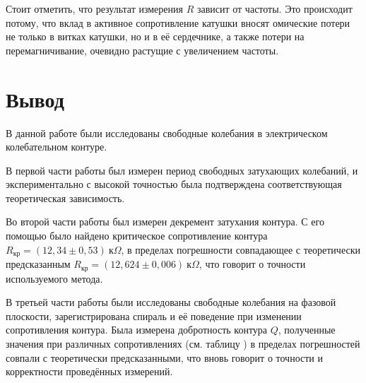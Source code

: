 \documentclass[a4paper,10pt]{article}
\begin{document}
Стоит отметить, что результат измерения $R$ зависит от частоты. Это происходит потому, что вклад в активное сопротивление катушки вносят омические потери не только в витках катушки, но и в её сердечнике, а также потери на перемагничивание, очевидно растущие с увеличением частоты.

\section*{Вывод}

В данной работе были исследованы свободные колебания в электрическом колебательном контуре.

В первой части работы был измерен период свободных затухающих колебаний, и экспериментально с высокой точностью была подтверждена соответствующая теоретическая зависимость.

Во второй части работы был измерен декремент затухания контура. С его помощью было найдено критическое сопротивление контура $R_{\text{кр}}=\left(12,34\pm0,53\right)~\text{к}\Omega$, в пределах погрешности совпадающее с теоретически предсказанным $R_{\text{кр}}=\left(12,624\pm0,006\right)~\text{к}\Omega$, что говорит о точности используемого метода.

В третьей части работы были исследованы свободные колебания на фазовой плоскости, зарегистрирована спираль и её поведение при изменении сопротивления контура. Была измерена добротность контура $Q$, полученные значения при различных сопротивлениях (см. таблицу ) в пределах погрешностей совпали с теоретически предсказанными, что вновь говорит о точности и корректности проведённых измерений.
\end{document}
